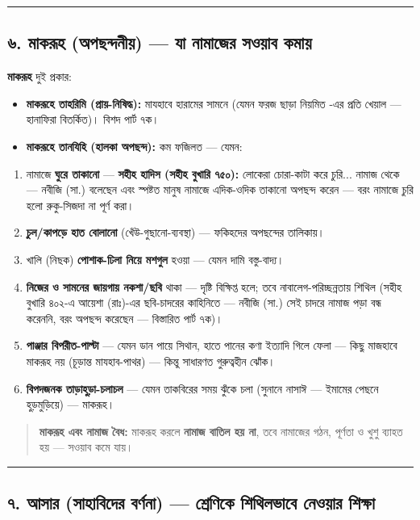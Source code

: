\medskip\hrule\medskip

\subsection*{৬. মাকরূহ (অপছন্দনীয়) — যা নামাজের সওয়াব কমায়}

\textbf{মাকরূহ} দুই প্রকার:
\begin{itemize}
\item \textbf{মাকরূহে তাহরিমি (প্রায়-নিষিদ্ধ):} মাযহাবে হারামের সামনে (যেমন ফরজ ছাড়া নিয়মিত -এর প্রতি খেয়াল — হানাফিরা বিতর্কিত)। বিশদ পার্ট ৭ক।
\item \textbf{মাকরূহে তানযিহি (হালকা অপছন্দ):} কম ফজিলত — যেমন:
\end{itemize}
\begin{enumerate}
\item নামাজে \textbf{ঘুরে তাকানো} — \textbf{সহীহ হাদিস (সহীহ বুখারি ৭৫০):} লোকেরা চোরা-কাটা করে চুরি... নামাজ থেকে — নবীজি (সা.) বলেছেন এবং স্পষ্টত মানুষ নামাজে এদিক-ওদিক তাকানো অপছন্দ করেন — বরং নামাজে চুরি হলো রুকু-সিজদা না পূর্ণ করা।
\item \textbf{চুল/কাপড়ে হাত বোলানো} (খেঁউ-গুছানো-ব্যবস্থা) — ফকিহদের অপছন্দের তালিকায়।
\item খালি (নিছক) \textbf{পোশাক-ঢিলা নিয়ে মশগুল} হওয়া — যেমন দামি বস্তু-বাদ্য।
\item \textbf{নিজের ও সামনের জায়গায় নকশা/ছবি} থাকা — দৃষ্টি বিক্ষিপ্ত হলে; তবে নাবালেগ-পরিচ্ছন্নতায় শিথিল (সহীহ বুখারি ৪০২-এ আয়েশা (রাঃ)-এর ছবি-চাদরের কাহিনিতে — নবীজি (সা.) সেই চাদরে নামাজ পড়া বন্ধ করেননি, বরং অপছন্দ করেছেন — বিস্তারিত পার্ট ৭ক)।
\item \textbf{পাঞ্জার বিপরীত-পাল্টা} — যেমন ডান পায়ে সিথান, হাতে পানের কণা ইত্যাদি গিলে ফেলা — কিছু মাজহাবে মাকরূহ নয় (চূড়ান্ত মাযহাব-পাথর) — কিন্তু সাধারণত গুরুত্বহীন ঝোঁক।
\item \textbf{বিপদজনক তাড়াহুড়া-চলাচল} — যেমন তাকবিরের সময় ঝুঁকে চলা (সুনানে নাসাঈ — ইমামের পেছনে হুড়মুড়িয়ে) — মাকরূহ।
\end{enumerate}
\begin{quote}
\textbf{মাকরূহ এবং নামাজ বৈধ:} মাকরূহ করলে \textbf{নামাজ বাতিল হয় না}, তবে নামাজের গঠন, পূর্ণতা ও খুশু ব্যাহত হয় — সওয়াব কমে যায়।
\end{quote}

\medskip\hrule\medskip

\subsection*{৭. আসার (সাহাবিদের বর্ণনা) — শ্রেণিকে শিথিলভাবে নেওয়ার শিক্ষা}

